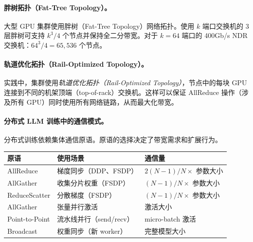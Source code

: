 \paragraph{胖树拓扑（Fat-Tree Topology）。}
\label{fat-tree-topology.}

大型 GPU 集群使用胖树（Fat-Tree Topology）网络拓扑。使用 $k$ 端口交换机的 3 层胖树可支持 $k^3/4$ 个节点并保持全二分带宽。对于 $k=64$ 端口的 400Gb/s NDR 交换机：$64^3/4 = 65{,}536$ 个节点。

\paragraph{轨道优化拓扑（Rail-Optimized Topology）。}
\label{rail-optimized-topology.}

实践中，集群使用\emph{轨道优化拓扑（Rail-Optimized Topology）}，节点中的每块 GPU 连接到不同的机架顶端（top-of-rack）交换机。这样可以保证 AllReduce 操作（涉及所有 GPU）同时使用所有网络链路，从而最大化带宽。

\paragraph{分布式 LLM 训练中的通信模式。}
\label{communication-patterns-in-distributed-llm-training.}

分布式训练依赖集体通信原语。原语的选择决定了带宽需求和扩展行为。

\begin{keybox}[通信原语]
\begin{center}
\begin{tabular}{@{}l l l@{}}
\toprule
\textbf{原语} & \textbf{使用场景} & \textbf{通信量} \\
\midrule
AllReduce & 梯度同步（DDP、FSDP） & $2(N-1)/N \times$ 参数大小 \\
AllGather & 收集分片权重（FSDP） & $(N-1)/N \times$ 参数大小 \\
ReduceScatter & 分散梯度（FSDP） & $(N-1)/N \times$ 参数大小 \\
AllGather & 张量并行激活 & 激活大小 \\
Point-to-Point & 流水线并行（send/recv） & micro-batch 激活 \\
Broadcast & 权重同步（新 worker） & 完整模型大小 \\
\bottomrule
\end{tabular}
\end{center}
\end{keybox}

